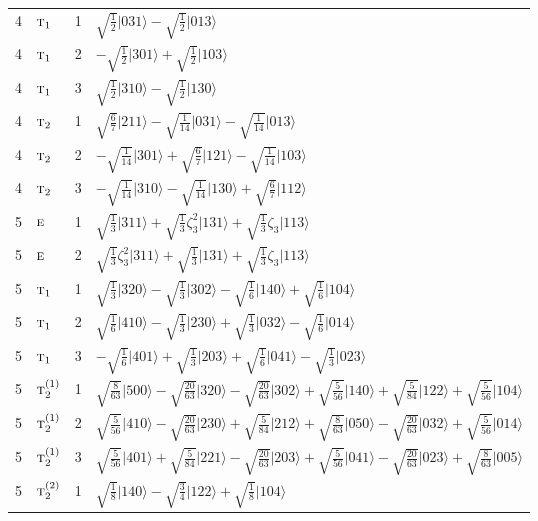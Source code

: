 \documentclass[11pt]{article}
\newcommand{\irr}[1]{\text{\normalfont\scshape #1}}
\newcommand{\rootunity}[1]{\zeta_{#1}}
\newcommand{\occ}[1]{\lvert #1\rangle}
\begin{document}
\begin{longtable}{c l c p{}}
4 & $\irr{t}_{1}$ & 1 & $\sqrt{\tfrac{1}{2}}\occ{031}-\sqrt{\tfrac{1}{2}}\occ{013}$\\
4 & $\irr{t}_{1}$ & 2 & $-\sqrt{\tfrac{1}{2}}\occ{301}+\sqrt{\tfrac{1}{2}}\occ{103}$\\
4 & $\irr{t}_{1}$ & 3 & $\sqrt{\tfrac{1}{2}}\occ{310}-\sqrt{\tfrac{1}{2}}\occ{130}$\\
4 & $\irr{t}_{2}$ & 1 & $\sqrt{\tfrac{6}{7}}\occ{211}-\sqrt{\tfrac{1}{14}}\occ{031}-\sqrt{\tfrac{1}{14}}\occ{013}$\\
4 & $\irr{t}_{2}$ & 2 & $-\sqrt{\tfrac{1}{14}}\occ{301}+\sqrt{\tfrac{6}{7}}\occ{121}-\sqrt{\tfrac{1}{14}}\occ{103}$\\
4 & $\irr{t}_{2}$ & 3 & $-\sqrt{\tfrac{1}{14}}\occ{310}-\sqrt{\tfrac{1}{14}}\occ{130}+\sqrt{\tfrac{6}{7}}\occ{112}$\\
\hline
5 & $\irr{e}$ & 1 & $\sqrt{\tfrac{1}{3}}\occ{311}+\sqrt{\tfrac{1}{3}}\rootunity{3}^{2}\occ{131}+\sqrt{\tfrac{1}{3}}\rootunity{3}\occ{113}$\\
5 & $\irr{e}$ & 2 & $\sqrt{\tfrac{1}{3}}\rootunity{3}^{2}\occ{311}+\sqrt{\tfrac{1}{3}}\occ{131}+\sqrt{\tfrac{1}{3}}\rootunity{3}\occ{113}$\\
5 & $\irr{t}_{1}$ & 1 & $\sqrt{\tfrac{1}{3}}\occ{320}-\sqrt{\tfrac{1}{3}}\occ{302}-\sqrt{\tfrac{1}{6}}\occ{140}+\sqrt{\tfrac{1}{6}}\occ{104}$\\
5 & $\irr{t}_{1}$ & 2 & $\sqrt{\tfrac{1}{6}}\occ{410}-\sqrt{\tfrac{1}{3}}\occ{230}+\sqrt{\tfrac{1}{3}}\occ{032}-\sqrt{\tfrac{1}{6}}\occ{014}$\\
5 & $\irr{t}_{1}$ & 3 & $-\sqrt{\tfrac{1}{6}}\occ{401}+\sqrt{\tfrac{1}{3}}\occ{203}+\sqrt{\tfrac{1}{6}}\occ{041}-\sqrt{\tfrac{1}{3}}\occ{023}$\\
5 & $\irr{t}_{2}^{(1)}$ & 1 & $\sqrt{\tfrac{8}{63}}\occ{500}-\sqrt{\tfrac{20}{63}}\occ{320}-\sqrt{\tfrac{20}{63}}\occ{302}+\sqrt{\tfrac{5}{56}}\occ{140}+\sqrt{\tfrac{5}{84}}\occ{122}+\sqrt{\tfrac{5}{56}}\occ{104}$\\
5 & $\irr{t}_{2}^{(1)}$ & 2 & $\sqrt{\tfrac{5}{56}}\occ{410}-\sqrt{\tfrac{20}{63}}\occ{230}+\sqrt{\tfrac{5}{84}}\occ{212}+\sqrt{\tfrac{8}{63}}\occ{050}-\sqrt{\tfrac{20}{63}}\occ{032}+\sqrt{\tfrac{5}{56}}\occ{014}$\\
5 & $\irr{t}_{2}^{(1)}$ & 3 & $\sqrt{\tfrac{5}{56}}\occ{401}+\sqrt{\tfrac{5}{84}}\occ{221}-\sqrt{\tfrac{20}{63}}\occ{203}+\sqrt{\tfrac{5}{56}}\occ{041}-\sqrt{\tfrac{20}{63}}\occ{023}+\sqrt{\tfrac{8}{63}}\occ{005}$\\
5 & $\irr{t}_{2}^{(2)}$ & 1 & $\sqrt{\tfrac{1}{8}}\occ{140}-\sqrt{\tfrac{3}{4}}\occ{122}+\sqrt{\tfrac{1}{8}}\occ{104}$\\

\end{longtable}
\end{document}
